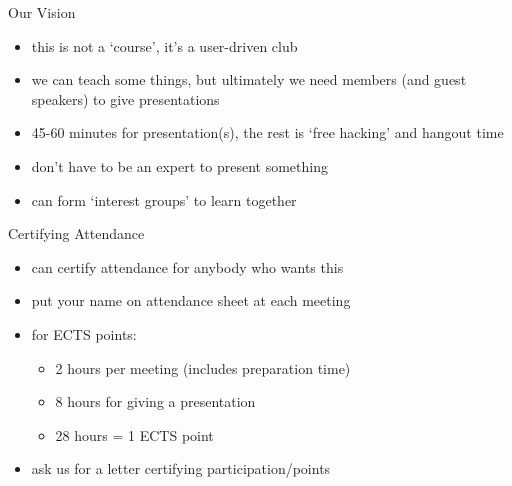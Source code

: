 \documentclass[t,12pt]{beamer}
\begin{document}
\begin{frame}{Our Vision}

\begin{itemize}
   \item this is not a `course', it's a user-driven club
   \item we can teach some things, but ultimately we need members (and guest speakers) to give presentations
   \item 45-60 minutes for presentation(s), the rest is `free hacking' and hangout time
   \item don't have to be an expert to present something
   \item can form `interest groups' to learn together
\end{itemize}

\end{frame}


\begin{frame}{Certifying Attendance}

\begin{itemize}
   \item can certify attendance for anybody who wants this
   \item put your name on attendance sheet at each meeting
   \item for ECTS points:
   \begin{itemize}
      \item 2 hours per meeting (includes preparation time)
      \item 8 hours for giving a presentation
      \item 28 hours = 1 ECTS point
   \end{itemize}
   \item ask us for a letter certifying participation/points
\end{itemize}

\end{frame}

\end{document}
